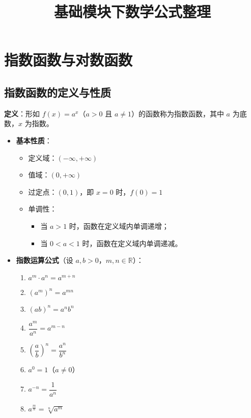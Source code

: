 \documentclass{article}
\title{基础模块下数学公式整理}
\author{}
\date{}
\begin{document}
\maketitle

\section{指数函数与对数函数}

\subsection{指数函数的定义与性质}
\textbf{定义}：形如 \( f(x) = a^x \)（\( a > 0 \) 且 \( a \neq 1 \)）的函数称为指数函数，其中 \( a \) 为底数，\( x \) 为指数。

\begin{itemize}
    \item \textbf{基本性质}：
    \begin{itemize}
        \item 定义域：\( (-\infty, +\infty) \)
        \item 值域：\( (0, +\infty) \)
        \item 过定点：\( (0, 1) \)，即 \( x=0 \) 时，\( f(0) = 1 \)
        \item 单调性：
        \begin{itemize}
            \item 当 \( a > 1 \) 时，函数在定义域内单调递增；
            \item 当 \( 0 < a < 1 \) 时，函数在定义域内单调递减。
        \end{itemize}
    \end{itemize}
    
    \item \textbf{指数运算公式}（设 \( a, b > 0 \)，\( m, n \in \mathbb{R} \)）：
    \begin{enumerate}
        \item \( a^m \cdot a^n = a^{m+n} \)
        \item \( (a^m)^n = a^{mn} \)
        \item \( (ab)^n = a^n b^n \)
        \item \( \dfrac{a^m}{a^n} = a^{m-n} \)
        \item \( \left( \dfrac{a}{b} \right)^n = \dfrac{a^n}{b^n} \)
        \item \( a^0 = 1 \)（\( a \neq 0 \)）
        \item \( a^{-n} = \dfrac{1}{a^n} \)
        \item \( a^{\frac{m}{n}} = \sqrt[n]{a^m} \)
    \end{enumerate}
\end{itemize}
\end{document}
